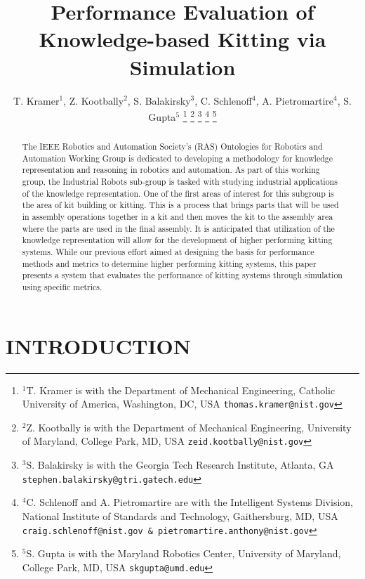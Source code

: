 \documentclass[letterpaper, 10 pt, conference]{ieeeconf}  %
\title{\LARGE \bf
Performance Evaluation of Knowledge-based Kitting via Simulation
}
\author{T. Kramer$^{1}$, Z. Kootbally$^{2}$, S. Balakirsky$^{3}$, C. Schlenoff$^{4}$, A. Pietromartire$^{4}$, S. Gupta$^{5}$%
\thanks{$^{1}$T. Kramer is with the Department of Mechanical Engineering, Catholic University of America, Washington, DC, USA
        {\tt\small thomas.kramer@nist.gov}}%
\thanks{$^{2}$Z. Kootbally is with the Department of Mechanical Engineering, University of Maryland, College Park, MD, USA
        {\tt\small zeid.kootbally@nist.gov}}
\thanks{$^{3}$S. Balakirsky is with the Georgia Tech Research Institute, Atlanta, GA
{\tt\small stephen.balakirsky@gtri.gatech.edu}}%
\thanks{$^{4}$C. Schlenoff and A. Pietromartire are with the Intelligent Systems Division,
National Institute of Standards and Technology, Gaithersburg, MD, USA
{\tt\small craig.schlenoff@nist.gov \& pietromartire.anthony@nist.gov}}%
\thanks{$^{5}$S. Gupta is with the Maryland Robotics Center, University of Maryland,
College Park, MD, USA
        {\tt\small skgupta@umd.edu}}%
}
\begin{document}
\maketitle
\thispagestyle{empty}
\pagestyle{empty}


\begin{abstract}

The IEEE Robotics and Automation Society's (RAS) Ontologies for Robotics
and Automation Working Group is dedicated to developing a methodology for
knowledge representation and reasoning in robotics and automation. As part
of this working group, the Industrial Robots sub-group is tasked with
studying industrial applications of the knowledge representation. One of
the first areas of interest for this subgroup is the area of kit building
or kitting. This is a process that brings parts that will be used in
assembly operations together in a kit and then moves the kit to the
assembly area where the parts are used in the final assembly. It is
anticipated that utilization of the knowledge representation will allow for
the development of higher performing kitting systems. While our previous
effort aimed at designing the basis for performance methods and metrics to
determine higher performing kitting systems, this paper presents a system
that evaluates the performance of kitting systems through simulation using
specific metrics.

\end{abstract}



\section{INTRODUCTION} 
\label{sect:Introduction}



\end{document}
